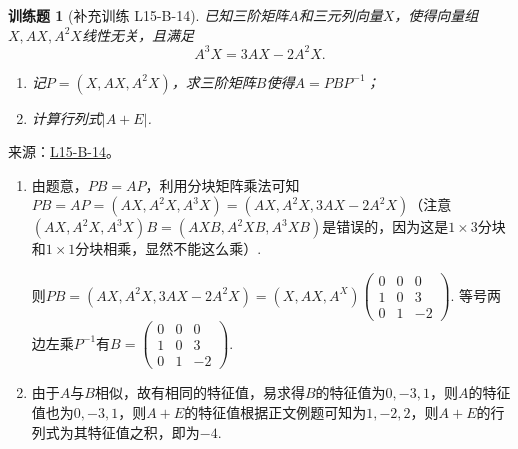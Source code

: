 \documentclass[12pt,fontset=fandol]{ctexart}
\newtheorem{exercise}{训练题}[section]
\begin{document}
\begin{exercise}[补充训练 L15-B-14]\label{prob:L15-B-14}
已知三阶矩阵$A$和三元列向量$X$，使得向量组$X,AX,A^2X$线性无关，且满足
        \[A^3X=3AX-2A^2X.\]
        \begin{enumerate}
            \item 记$P=(X,AX,A^2X)$，求三阶矩阵$B$使得$A=PBP^{-1}$；

            \item 计算行列式$|A+E|$.
        \end{enumerate}
\end{exercise}
\noindent 来源：\href{https://github.com/yhwu-is/Linear-Algebra-Left-Undone/blob/new/%E8%AE%B2%E4%B9%89/%E4%B8%93%E9%A2%98/15%20%E7%9B%B8%E4%BC%BC%E6%A0%87%E5%87%86%E5%BD%A2%EF%BC%9A%E5%A4%8D%E6%95%B0%E5%9F%9F%E4%B8%8A%E7%9A%84%E5%B0%9D%E8%AF%95%E4%B8%8E%E7%90%86%E8%AE%BA.tex}{L15-B-14}。
\begin{solve}
\begin{enumerate}
              \item 由题意，$PB=AP$，利用分块矩阵乘法可知$PB=AP=(AX,A^2X,A^3X)=(AX,A^2X,3AX-2A^2X)$（注意$(AX,A^2X,A^3X)B=(AXB,A^2XB,A^3XB)$是错误的，因为这是$1\times 3$分块和$1\times 1$分块相乘，显然不能这么乘）.

                    则$PB=(AX,A^2X,3AX-2A^2X)=(X,AX,A^X)\begin{pmatrix}
                            0 & 0 & 0 \\ 1 & 0 & 3 \\ 0 & 1 & -2
                        \end{pmatrix}$. 等号两边左乘$P^{-1}$有$B=\begin{pmatrix}
                            0 & 0 & 0 \\ 1 & 0 & 3 \\ 0 & 1 & -2
                        \end{pmatrix}$.

              \item 由于$A$与$B$相似，故有相同的特征值，易求得$B$的特征值为$0,-3,1$，则$A$的特征值也为$0,-3,1$，则$A+E$的特征值根据正文例题可知为$1,-2,2$，则$A+E$的行列式为其特征值之积，即为$-4$.
          \end{enumerate}
\end{solve}
\end{document}
